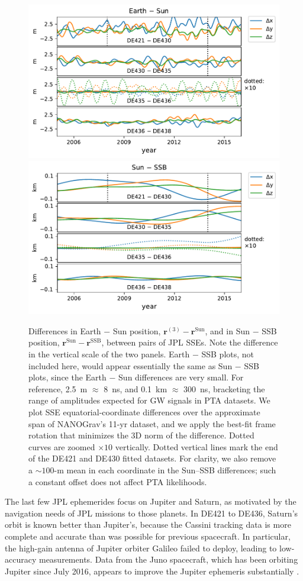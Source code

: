 \documentclass{aastex63}
\begin{document}
\begin{figure}[t]
    \centering
    \includegraphics[width=0.49\columnwidth]{figures/EarthSunDiff.pdf}
    \includegraphics[width=0.49\columnwidth]{figures/SunSSBDiff.pdf}
    \caption{Differences in Earth $-$ Sun position, $\mathbf{r}^{(3)} - \mathbf{r}^\mathrm{Sun}$, and in Sun $-$ SSB position, $\mathbf{r}^\mathrm{Sun} - \mathbf{r}^\mathrm{SSB}$, between pairs of JPL SSEs. Note the difference in the vertical scale of the two panels.
    Earth $-$ SSB plots, not included here, would appear essentially the same as Sun $-$ SSB plots, since the Earth $-$ Sun differences are very small. For reference, 2.5~m $\approx$ 8~ns, and 0.1~km $\approx$ 300~ns, bracketing the range of amplitudes expected for GW signals in PTA datasets.
    We plot SSE equatorial-coordinate differences over the approximate span of NANOGrav's 11-yr dataset, and we apply the best-fit frame rotation that minimizes the 3D norm of the difference. Dotted curves are zoomed $\times 10$ vertically. Dotted vertical lines mark the end of the DE421 and DE430 fitted datasets.
    For clarity, we also remove a $\sim 100$-m mean in each coordinate in the Sun--SSB differences; such a constant offset does not affect PTA likelihoods.
    \label{fig:earthsun}}
\end{figure}

The last few JPL ephemerides focus on Jupiter and Saturn, as motivated by the navigation needs of JPL missions to those planets. In DE421 to DE436, Saturn's orbit is known better than Jupiter's, because the Cassini tracking data is more complete and accurate than was possible for previous spacecraft. In particular, the high-gain antenna of Jupiter orbiter Galileo failed to deploy, leading to low-accuracy measurements. Data from the Juno spacecraft, which has been orbiting Jupiter since July 2016, appears to improve the Jupiter ephemeris substantially \citep{2009IPNPR.178C...1F}.
\end{document}
